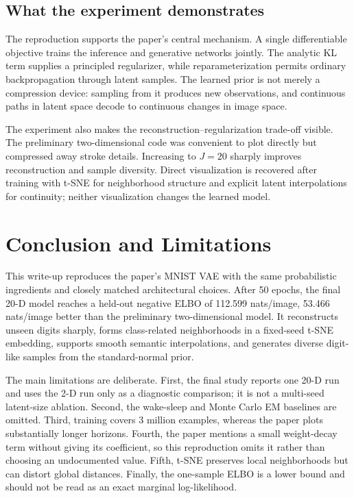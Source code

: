 \documentclass[11pt]{article}
\begin{document}
\subsection{What the experiment demonstrates}

The reproduction supports the paper's central mechanism. A single differentiable objective trains the inference and generative networks jointly. The analytic KL term supplies a principled regularizer, while reparameterization permits ordinary backpropagation through latent samples. The learned prior is not merely a compression device: sampling from it produces new observations, and continuous paths in latent space decode to continuous changes in image space.

The experiment also makes the reconstruction--regularization trade-off visible. The preliminary two-dimensional code was convenient to plot directly but compressed away stroke details. Increasing to $J=20$ sharply improves reconstruction and sample diversity. Direct visualization is recovered after training with t-SNE for neighborhood structure and explicit latent interpolations for continuity; neither visualization changes the learned model.

\section{Conclusion and Limitations}

This write-up reproduces the paper's MNIST VAE with the same probabilistic ingredients and closely matched architectural choices. After 50 epochs, the final 20-D model reaches a held-out negative ELBO of 112.599 nats/image, 53.466 nats/image better than the preliminary two-dimensional model. It reconstructs unseen digits sharply, forms class-related neighborhoods in a fixed-seed t-SNE embedding, supports smooth semantic interpolations, and generates diverse digit-like samples from the standard-normal prior.

The main limitations are deliberate. First, the final study reports one 20-D run and uses the 2-D run only as a diagnostic comparison; it is not a multi-seed latent-size ablation. Second, the wake-sleep and Monte Carlo EM baselines are omitted. Third, training covers 3 million examples, whereas the paper plots substantially longer horizons. Fourth, the paper mentions a small weight-decay term without giving its coefficient, so this reproduction omits it rather than choosing an undocumented value. Fifth, t-SNE preserves local neighborhoods but can distort global distances. Finally, the one-sample ELBO is a lower bound and should not be read as an exact marginal log-likelihood.
\end{document}
